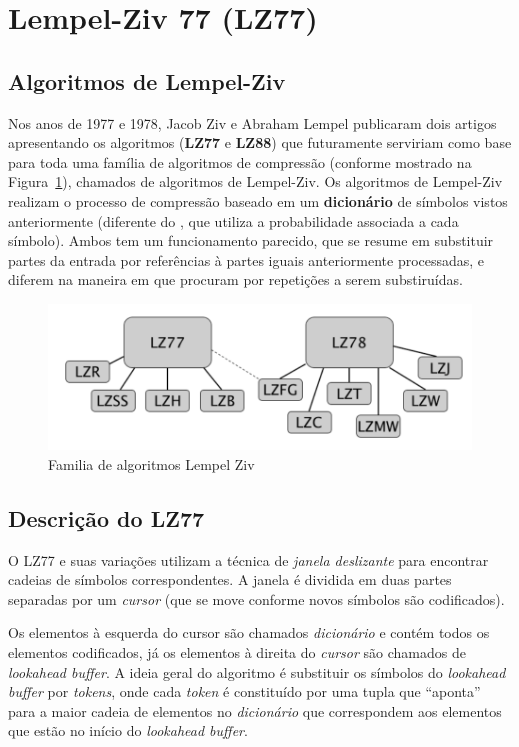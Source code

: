 \section{Lempel-Ziv 77 (LZ77)}

\subsection{Algoritmos de Lempel-Ziv}
Nos anos de 1977 e 1978, Jacob Ziv e Abraham Lempel publicaram dois artigos apresentando os algoritmos (\textbf{LZ77} e \textbf{LZ88}) que futuramente serviriam como base para toda uma família de algoritmos de compressão (conforme mostrado na Figura~\ref{fig:lz77}), chamados de algoritmos de Lempel-Ziv.
Os algoritmos de Lempel-Ziv realizam o processo de compressão baseado em um \textbf{dicionário} de símbolos vistos anteriormente (diferente do , que utiliza a probabilidade associada a cada símbolo). 
Ambos tem um funcionamento parecido, que se resume em substituir partes da entrada por referências à partes iguais anteriormente processadas, e diferem na maneira em que procuram por repetições a serem substiruídas. 

\begin{figure}[h]
   \centering
   \includegraphics[scale=0.75]{figs/lz77fam.png}
    \caption{Familia de algoritmos Lempel Ziv}
    \label{fig:lz77}
 \end{figure}

\subsection{Descrição do LZ77}
O LZ77 e suas variações utilizam a técnica de \emph{janela deslizante} para encontrar cadeias de símbolos correspondentes. A janela é dividida em duas partes separadas por um \emph{cursor} (que se move conforme novos símbolos são codificados).

Os elementos à esquerda do cursor são chamados \emph{dicionário} e contém todos os elementos codificados, já os elementos à direita do \emph{cursor} são chamados de \emph{lookahead buffer}.
A ideia geral do algoritmo é substituir os símbolos do \emph{lookahead buffer} por \emph{tokens}, onde cada \emph{token} é constituído por uma tupla que ``aponta'' para a maior cadeia de elementos no \emph{dicionário} que correspondem aos elementos que estão no início do \emph{lookahead buffer}.

